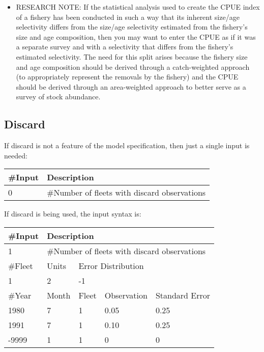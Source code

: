 \begin{description}
\begin{itemize}
		\item RESEARCH NOTE:  If the statistical analysis used to create the CPUE index of a fishery has been conducted in such a way that its inherent size/age selectivity differs from the size/age selectivity estimated from the fishery’s size and age composition, then you may want to enter the CPUE as if it was a separate survey and with a selectivity that differs from the fishery’s estimated selectivity.  The need for this split arises because the fishery size and age composition should be derived through a catch-weighted approach (to appropriately represent the removals by the fishery) and the CPUE should be derived through an area-weighted approach to better serve as a survey of stock abundance.
	\end{itemize}
\end{description}

\subsection{Discard}
If discard is not a feature of the model specification, then just a single input is needed:

\begin{center}
\begin{tabular}{p{2cm} p{13cm}}
	\#Input & Description\\
	\hline
	0 & \#Number of fleets with discard observations\\
	\hline
\end{tabular}
\end{center}

	
\noindent	
If discard is being used, the input syntax is:
	\begin{center}
		\begin{tabular}{p{2cm} p{3cm} p{3cm} p{3cm} p{3cm}}
			\#Input & \multicolumn{4}{l}{Description}\\
			\hline
			1 & \multicolumn{4}{l}{\#Number of fleets with discard observations}\\
			\hline
			\#Fleet & Units & \multicolumn{3}{l}{Error Distribution}\\
			\hline
			1 & 2 & \multicolumn{3}{l}{-1}\\
			\hline
			\#Year & Month & Fleet  & Observation & Standard Error \\
			\hline
			1980  & 7 & 1 & 0.05 & 0.25 \\
			1991  & 7 & 1 & 0.10 & 0.25 \\
			-9999 & 1 & 1 & 0    & 0 \\
			\hline
		\end{tabular}
	\end{center}
	
